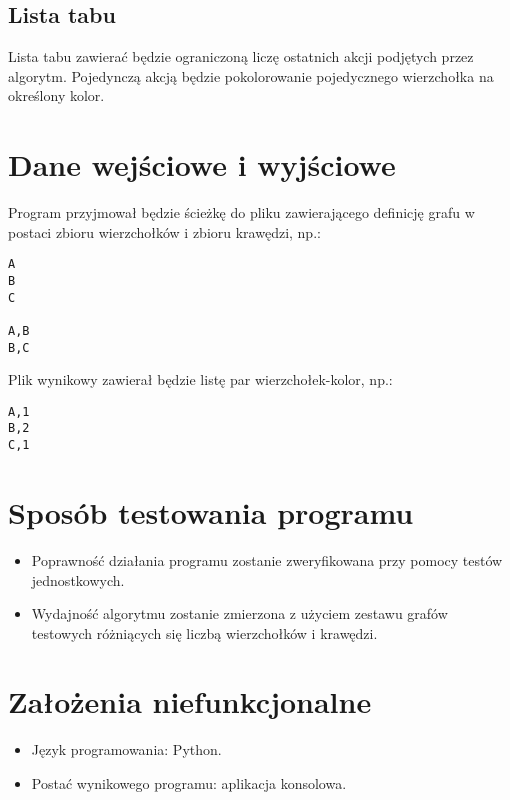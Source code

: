 \documentclass[a4paper,10pt]{article}
\begin{document}
\subsection{Lista tabu}
Lista tabu zawierać będzie ograniczoną liczę ostatnich akcji podjętych przez algorytm.
Pojedynczą akcją będzie pokolorowanie pojedycznego wierzchołka na określony kolor.


\section{Dane wejściowe i wyjściowe}
Program przyjmował będzie ścieżkę do pliku zawierającego definicję grafu w postaci zbioru wierzchołków i zbioru krawędzi, np.:

\begin{verbatim}
A
B
C

A,B
B,C
\end{verbatim}

Plik wynikowy zawierał będzie listę par wierzchołek-kolor, np.:

\begin{verbatim}
A,1
B,2
C,1
\end{verbatim}



\section{Sposób testowania programu}

\begin{itemize}
 \item Poprawność działania programu zostanie zweryfikowana przy pomocy testów jednostkowych.
 \item Wydajność algorytmu zostanie zmierzona z użyciem zestawu grafów testowych różniących się liczbą wierzchołków i krawędzi.
\end{itemize}







\section{Założenia niefunkcjonalne}

\begin{itemize}
 \item Język programowania: Python.
 \item Postać wynikowego programu: aplikacja konsolowa.
\end{itemize}
\end{document}
